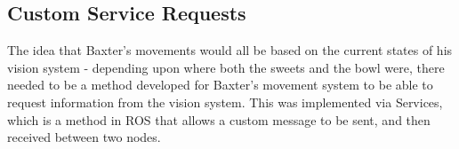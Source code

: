 \subsection{Custom Service Requests}
The idea that Baxter's movements would all be based on the current states of his vision system - depending upon where both the sweets and the bowl were, there needed to be a method developed for Baxter's movement system to be able to request information from the vision system. This was implemented via Services, which is a method in ROS that allows a custom message to be sent, and then received between two nodes.